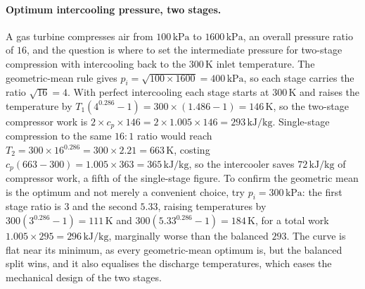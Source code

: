 \paragraph{Optimum intercooling pressure, two stages.} A gas turbine
compresses air from $100\,\text{kPa}$ to $1600\,\text{kPa}$, an overall
pressure ratio of $16$, and the question is where to set the intermediate
pressure for two-stage compression with intercooling back to the
$300\,\si{\kelvin}$ inlet temperature. The geometric-mean rule gives
$p_i = \sqrt{100 \times 1600} = 400\,\text{kPa}$, so each stage carries the
ratio $\sqrt{16} = 4$. With perfect intercooling each stage starts at
$300\,\si{\kelvin}$ and raises the temperature by $T_1(4^{0.286} - 1) = 300
\times (1.486 - 1) = 146\,\si{\kelvin}$, so the two-stage compressor work is
$2 \times c_p \times 146 = 2 \times 1.005 \times 146 = 293\,\text{kJ}/
\text{kg}$. Single-stage compression to the same $16:1$ ratio would reach
$T_2 = 300 \times 16^{0.286} = 300 \times 2.21 = 663\,\si{\kelvin}$, costing
$c_p(663 - 300) = 1.005 \times 363 = 365\,\text{kJ}/\text{kg}$, so the
intercooler saves $72\,\text{kJ}/\text{kg}$ of compressor work, a fifth of
the single-stage figure. To confirm the geometric mean is the optimum and not
merely a convenient choice, try $p_i = 300\,\text{kPa}$: the first stage
ratio is $3$ and the second $5.33$, raising temperatures by $300(3^{0.286} -
1) = 111\,\si{\kelvin}$ and $300(5.33^{0.286} - 1) = 184\,\si{\kelvin}$, for a
total work $1.005 \times 295 = 296\,\text{kJ}/\text{kg}$, marginally worse
than the balanced $293$. The curve is flat near its minimum, as every
geometric-mean optimum is, but the balanced split wins, and it also equalises
the discharge temperatures, which eases the mechanical design of the two
stages.

